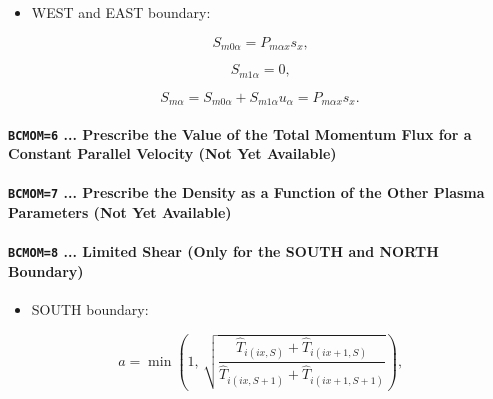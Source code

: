 \documentclass[11pt]{article}
\begin{document}
\bigskip

\begin{itemize}
\item  WEST and EAST boundary:
\end{itemize}

\bigskip

\begin{equation}
S_{m0\alpha}=P_{m\alpha x}s_{x}\text{,}   \label{c132}
\end{equation}

\begin{equation}
S_{m1\alpha}=0\text{,}   \label{c133}
\end{equation}

\begin{equation}
S_{m\alpha}=S_{m0\alpha}+S_{m1\alpha}u_{\alpha}=P_{m\alpha x}s_{x}\text{.} 
\label{c134}
\end{equation}

\bigskip

\paragraph{\texttt{BCMOM=6} ... Prescribe the Value of the Total Momentum
Flux for a Constant Parallel Velocity (Not Yet Available)}

\bigskip

\bigskip

\paragraph{\texttt{BCMOM=7} ... Prescribe the Density as a Function of the
Other Plasma Parameters (Not Yet Available)}

\bigskip

\bigskip

\paragraph{\texttt{BCMOM=8} ... Limited Shear (Only for the SOUTH and NORTH
Boundary)}

\bigskip

\begin{itemize}
\item  SOUTH boundary:
\end{itemize}

\bigskip

\begin{equation}
a=\min\left( 1\text{, }\sqrt{\frac{\widehat{T}_{i\left( ix,S\right) }+%
\widehat{T}_{i\left( ix+1,S\right) }}{\widehat{T}_{i\left( ix,S+1\right) }+%
\widehat{T}_{i\left( ix+1,S+1\right) }}}\right) \text{,}   \label{c135}
\end{equation}
\end{document}
